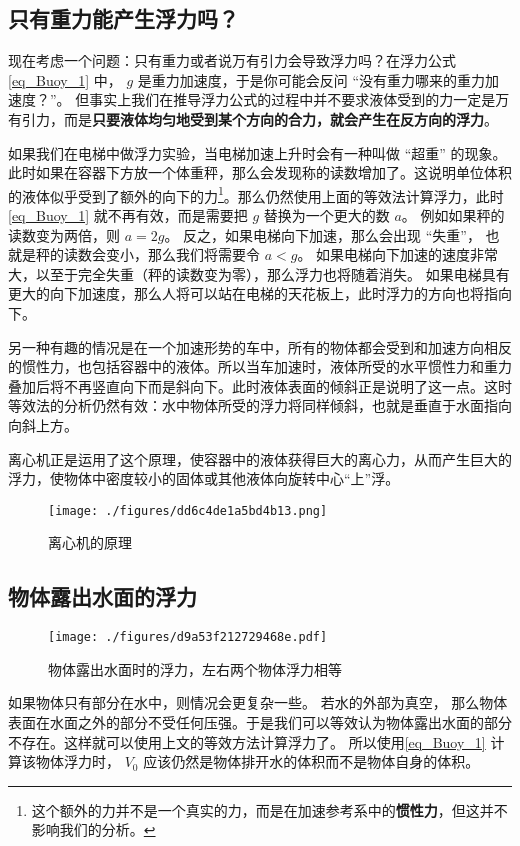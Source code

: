 \subsection{只有重力能产生浮力吗？}
现在考虑一个问题：只有重力或者说万有引力会导致浮力吗？在浮力公式\autoref{eq_Buoy_1} 中， $g$ 是重力加速度，于是你可能会反问 “没有重力哪来的重力加速度？”。 但事实上我们在推导浮力公式的过程中并不要求液体受到的力一定是万有引力，而是\textbf{只要液体均匀地受到某个方向的合力，就会产生在反方向的浮力}。

如果我们在电梯中做浮力实验，当电梯加速上升时会有一种叫做 “超重” 的现象。 此时如果在容器下方放一个体重秤，那么会发现称的读数增加了。这说明单位体积的液体似乎受到了额外的向下的力\footnote{这个额外的力并不是一个真实的力，而是在加速参考系中的\textbf{惯性力}，但这并不影响我们的分析。}。那么仍然使用上面的等效法计算浮力，此时\autoref{eq_Buoy_1} 就不再有效，而是需要把 $g$ 替换为一个更大的数 $a$。 例如如果秤的读数变为两倍，则 $a = 2g$。 反之，如果电梯向下加速，那么会出现 “失重”， 也就是秤的读数会变小，那么我们将需要令 $a < g$。 如果电梯向下加速的速度非常大，以至于完全失重（秤的读数变为零），那么浮力也将随着消失。 如果电梯具有更大的向下加速度，那么人将可以站在电梯的天花板上，此时浮力的方向也将指向下。

另一种有趣的情况是在一个加速形势的车中，所有的物体都会受到和加速方向相反的惯性力，也包括容器中的液体。所以当车加速时，液体所受的水平惯性力和重力叠加后将不再竖直向下而是斜向下。此时液体表面的倾斜正是说明了这一点。这时等效法的分析仍然有效：水中物体所受的浮力将同样倾斜，也就是垂直于水面指向向斜上方。

离心机正是运用了这个原理，使容器中的液体获得巨大的离心力，从而产生巨大的浮力，使物体中密度较小的固体或其他液体向旋转中心“上”浮。
\begin{figure}[ht]
\centering
\texttt{[image: ./figures/dd6c4de1a5bd4b13.png]}
\caption{离心机的原理} \label{fig_Buoy_3}
\end{figure}

\subsection{物体露出水面的浮力}
\begin{figure}[ht]
\centering
\texttt{[image: ./figures/d9a53f212729468e.pdf]}
\caption{物体露出水面时的浮力，左右两个物体浮力相等} \label{fig_Buoy_2}
\end{figure}
如果物体只有部分在水中，则情况会更复杂一些。 若水的外部为真空， 那么物体表面在水面之外的部分不受任何压强。于是我们可以等效认为物体露出水面的部分不存在。这样就可以使用上文的等效方法计算浮力了。 所以使用\autoref{eq_Buoy_1} 计算该物体浮力时， $V_0$ 应该仍然是物体排开水的体积而不是物体自身的体积。

